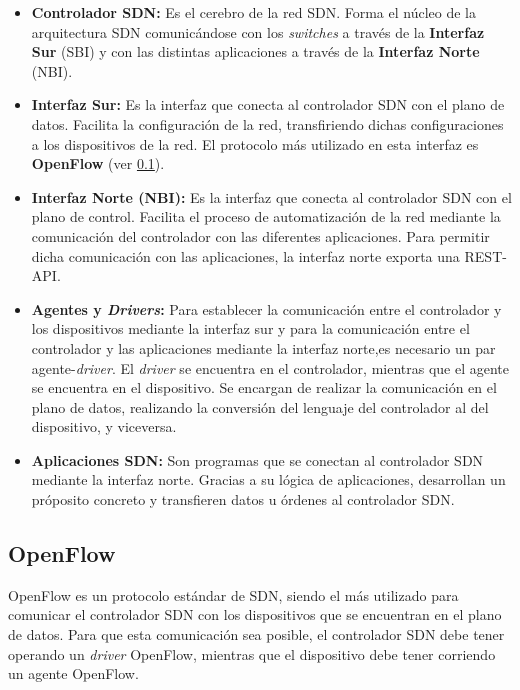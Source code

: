 \begin{itemize}
	\item \textbf{Controlador \ac{SDN}:} Es el cerebro de la red \ac{SDN}. Forma el núcleo de la arquitectura \ac{SDN} comunicándose con los \textit{switches} a través de la \textbf{Interfaz Sur} (\ac{SBI}) y con las distintas aplicaciones a través de la \textbf{Interfaz Norte} (\ac{NBI}).
	
	\item \textbf{Interfaz Sur:} Es la interfaz que conecta al controlador \ac{SDN} con el plano de datos. Facilita la configuración de la red, transfiriendo dichas configuraciones a los dispositivos de la red. El protocolo más utilizado en esta interfaz es \textbf{OpenFlow} (ver \ref{subsec:openflow}).
	
	\item \textbf{Interfaz Norte (\ac{NBI}):} Es la interfaz que conecta al controlador \ac{SDN} con el plano de control. Facilita el proceso de automatización de la red mediante la comunicación del controlador con las diferentes aplicaciones. Para permitir dicha comunicación con las aplicaciones, la interfaz norte exporta una REST-\ac{API}.
	
	\item \textbf{Agentes y \textit{Drivers}:} Para establecer la comunicación entre el controlador y los dispositivos mediante la interfaz sur y para la comunicación entre el controlador y las aplicaciones mediante la interfaz norte,es necesario un par agente-\textit{driver}. El \textit{driver} se encuentra en el controlador, mientras que el agente se encuentra en el dispositivo. Se encargan de realizar la comunicación en el plano de datos, realizando la conversión del lenguaje del controlador al del dispositivo, y viceversa.
	
	\item \textbf{Aplicaciones \ac{SDN}:} Son programas que se conectan al controlador \ac{SDN} mediante la interfaz norte. Gracias a su lógica de aplicaciones, desarrollan un próposito concreto y transfieren datos u órdenes al controlador \ac{SDN}.
\end{itemize}


\subsection{OpenFlow}
\label{subsec:openflow}

OpenFlow\cite{openflowbib} es un protocolo estándar de \ac{SDN}, siendo el más utilizado para comunicar el controlador \ac{SDN} con los dispositivos que se encuentran en el plano de datos. Para que esta comunicación sea posible, el controlador \ac{SDN} debe tener operando un \textit{driver} OpenFlow, mientras que el dispositivo debe tener corriendo un agente OpenFlow. 

